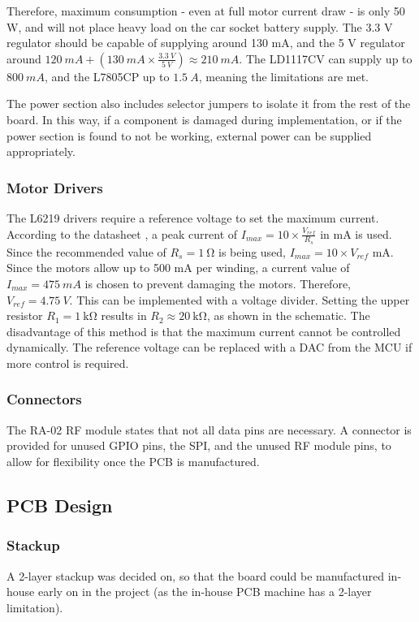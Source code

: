 Therefore, maximum consumption - even at full motor current draw - is only 50 W, and will not place heavy load on the car socket battery supply. The 3.3 V regulator should be capable of supplying around 130 mA, and the 5 V regulator around $\SI{120}{mA} + (\SI{130}{mA} \times \frac{\SI{3.3}{V}}{\SI{5}{V}}) \approx \SI{210}{mA}$. The LD1117CV can supply up to $\SI{800}{mA}$, and the L7805CP up to $\SI{1.5}{A}$, meaning the limitations are met.

The power section also includes selector jumpers to isolate it from the rest of the board. In this way, if a component is damaged during implementation, or if the power section is found to not be working, external power can be supplied appropriately.

\subsubsection{Motor Drivers}
The L6219 drivers require a reference voltage to set the maximum current. According to the datasheet \cite{datasheet-L6219}, a peak current of $I_{max} = 10 \times \frac{V_{ref}}{R_s}$ in mA is used. Since the recommended value of $R_s = \SI{1}{\ohm}$ is being used, $I_{max} = 10 \times V_{ref}$ mA. Since the motors allow up to 500 mA per winding, a current value of $I_{max} = \SI{475}{mA}$ is chosen to prevent damaging the motors. Therefore, $V_{ref} = \SI{4.75}{V}$. This can be implemented with a voltage divider. Setting the upper resistor $R_1 = \SI{1}{\kilo \ohm}$ results in $R_2 \approx \SI{20}{\kilo \ohm}$, as shown in the schematic. The disadvantage of this method is that the maximum current cannot be controlled dynamically. The reference voltage can be replaced with a DAC from the MCU if more control is required.

\subsubsection{Connectors}
The RA-02 RF module states that not all data pins are necessary. A connector is provided for unused GPIO pins, the SPI, and the unused RF module pins, to allow for flexibility once the PCB is manufactured.

\subsection{PCB Design}
\subsubsection{Stackup}
A 2-layer stackup was decided on, so that the board could be manufactured in-house early on in the project (as the in-house PCB machine has a 2-layer limitation).


